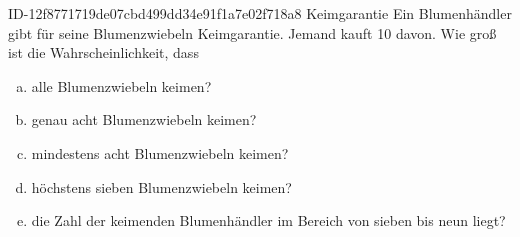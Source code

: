 \begin{exercise}
      {ID-12f8771719de07cbd499dd34e91f1a7e02f718a8}
      {Keimgarantie}
  \ifproblem\problem
    Ein Blumenhändler gibt für seine Blumenzwiebeln  Keimgarantie.
    Jemand kauft 10 davon. Wie groß ist die Wahrscheinlichkeit, dass
    \begin{enumerate}[a)]
      \item alle Blumenzwiebeln keimen?
      \item genau acht Blumenzwiebeln keimen?
      \item mindestens acht Blumenzwiebeln keimen?
      \item höchstens sieben Blumenzwiebeln keimen?
      \item die Zahl der keimenden Blumenhändler im Bereich von sieben bis
            neun liegt?
    \end{enumerate}
  \fi
\end{exercise}
